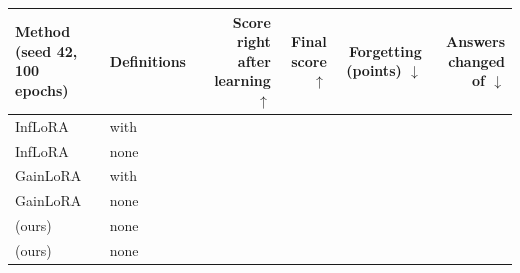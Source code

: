 {\footnotesize\setlength{\tabcolsep}{3pt}\begin{tabular}{p{1.9in}lrrrr}
    \toprule
    Method (seed 42, 100 epochs) & Definitions & \shortstack[r]{Score right\\after\\learning $\uparrow$} & \shortstack[r]{Final\\score $\uparrow$} & \shortstack[r]{Forgetting\\(points) $\downarrow$} & \shortstack[r]{Answers\\changed\\of \AudFullDefCompared{} $\downarrow$} \\
    \midrule
    InfLoRA & with & \AudFullDefOriginalInfloraLearned{} & \AudFullDefOriginalInfloraAP{} & \AudFullDefOriginalInfloraFT{} & \AudFullDefOriginalInfloraChanged{} \\
    InfLoRA & none & \AudFullInfloraLearned{} & \AudFullInfloraAP{} & \AudFullInfloraFT{} & \AudFullInfloraChanged{} \\
    \midrule
    GainLoRA & with & \AudFullDefOriginalGainloraLearned{} & \AudFullDefOriginalGainloraAP{} & \AudFullDefOriginalGainloraFT{} & \AudFullDefOriginalGainloraChanged{} \\
    GainLoRA & none & \AudFullGainloraLearned{} & \AudFullGainloraAP{} & \AudFullGainloraFT{} & \AudFullGainloraChanged{} \\
    \midrule
    \recog{} (ours) & none & \AudFullOursRidgeLearned{} & \AudFullOursRidgeAP{} & \AudFullOursRidgeFT{} & \AudFullOursRidgeChanged{} \\
    \handicap{} (ours) & none & \AudFullOursHandicapLearned{} & \AudFullOursHandicapAP{} & \AudFullOursHandicapFT{} & \AudFullOursHandicapChanged{} \\
    \bottomrule
\end{tabular}}

